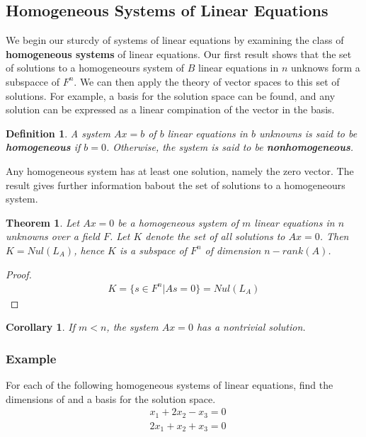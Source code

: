 \documentclass[10pt, oneside]{article}
\newtheorem{thm}{Theorem}
\newtheorem{defn}{Definition}
\newtheorem{cor}{Corollary}
\begin{document}
\subsection{Homogeneous Systems of Linear Equations}

We begin our sturcdy of systems of linear equations by examining the class of \textbf{homogeneous systems} of linear equations. Our first result shows that the set of solutions to a homogeneours system of $B$ linear
equations in $n$ unknows form a subspacce of $F^n$. We can then apply the theory of vector spaces to this set of solutions. For example, a basis for the solution space can be found, and any solution can be expressed as
a linear compination of the vector in the basis.

\begin{defn}
	A system $Ax = b$ of $b$ linear equations in $b$ unknowns is said to be \textbf{homogeneous} if $b = 0$. Otherwise, the system is said to be \textbf{nonhomogeneous}.
\end{defn}

Any homogeneous system has at least one solution, namely the zero vector. The result gives further information babout the set of solutions to a homogeneours system.

\begin{thm}
	Let $Ax = 0$ be a homogeneous system of $m$ linear equations in $n$ unknowns over a field $F$. Let $K$ denote the set of all solutions to $Ax = 0$. Then $K = Nul(L_A)$, hence $K$ is a subspace of $F^n$
	of dimension $n - rank(A)$.
\end{thm}

\begin{proof}
	\begin{align*}
		K = \{s \in F^n | As = 0\} = Nul(L_A)
	\end{align*}
\end{proof}

\begin{cor}
	If $m < n$, the system $Ax = 0$ has a nontrivial solution.
\end{cor}

\subsubsection{Example}

For each of the following homogeneous systems of linear equations, find the dimensions of and a basis for the solution space.
\[
	\begin{array}{ll}
		 & x_1 + 2x_2 - x_3 = 0 \\
		 & 2x_1 + x_2 + x_3 = 0
	\end{array}
\]
\end{document}
